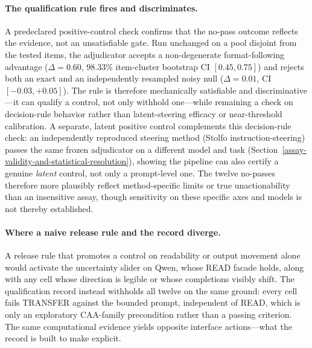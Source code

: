 \documentclass[manuscript,review,anonymous]{acmart}
\begin{document}
\paragraph{The qualification rule fires and discriminates.} A predeclared positive-control check confirms that the no-pass outcome reflects the evidence, not an unsatisfiable gate. Run unchanged on a pool disjoint from the tested items, the adjudicator accepts a non-degenerate format-following advantage (\(\Delta=0.60\), 98.33\% item-cluster bootstrap CI \([0.45,0.75]\)) and rejects both an exact and an independently resampled noisy null (\(\Delta=0.01\), CI \([-0.03,+0.05]\)). The rule is therefore mechanically satisfiable and discriminative---it can qualify a control, not only withhold one---while remaining a check on decision-rule behavior rather than latent-steering efficacy or near-threshold calibration. {}%
A separate, latent positive control complements this decision-rule check: an independently reproduced steering method (Stolfo instruction-steering) passes the same frozen adjudicator on a different model and task (Section~\ref{assay-validity-and-statistical-resolution}), showing the pipeline can also certify a genuine \emph{latent} control, not only a prompt-level one. The twelve no-passes therefore more plausibly reflect method-specific limits or true unactionability than an insensitive assay, though sensitivity on these specific axes and models is not thereby established. {}%

\paragraph{Where a naive release rule and the record diverge.} A release rule that promotes a control on readability or output movement alone would activate the uncertainty slider on Qwen, whose READ facade holds, along with any cell whose direction is legible or whose completions visibly shift. The qualification record instead withholds all twelve on the same ground: every cell fails TRANSFER against the bounded prompt, independent of READ, which is only an exploratory CAA-family precondition rather than a passing criterion. The same computational evidence yields opposite interface actions---what the record is built to make explicit.
\end{document}
